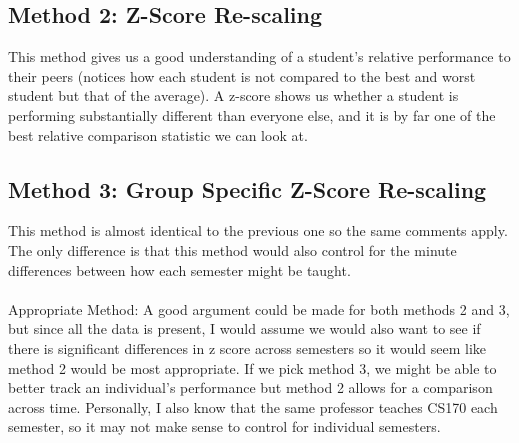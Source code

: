 \documentclass{article}
\begin{document}
\subsection{Method 2: Z-Score Re-scaling}
This method gives us a good understanding of a student's relative performance to their peers (notices how each student is not compared to the best and worst student but that of the average). A z-score shows us whether a student is performing substantially different than everyone else, and it is by far one of the best relative comparison statistic we can look at.
\subsection{Method 3: Group Specific Z-Score Re-scaling}
This method is almost identical to the previous one so the same comments apply. The only difference is that this method would also control for the minute differences between how each semester might be taught.
\\\\Appropriate Method: A good argument could be made for both methods 2 and 3, but since all the data is present, I would assume we would also want to see if there is significant differences in z score across semesters so it would seem like method 2 would be most appropriate. If we pick method 3, we might be able to better track an individual's performance but method 2 allows for a comparison across time. Personally, I also know that the same professor teaches CS170 each semester, so it may not make sense to control for individual semesters.
\end{document}
